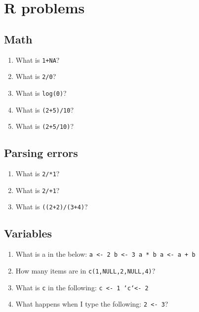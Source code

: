 \documentclass[12pt,a4paper]{article}
\begin{document}
\section*{R problems}

\onehalfspacing

\subsection*{Math}

\begin{enumerate}
\item What is \texttt{1+NA}?
\item What is \texttt{2/0}?
\item What is \texttt{log(0)}?
\vspace{1em}
\item What is \texttt{(2+5)/10}?
\item What is \texttt{(2+5/10)}?
\end{enumerate}


\subsection*{Parsing errors}
\begin{enumerate}
\item What is \texttt{2/*1}?
\item What is \texttt{2/+1}?
\vspace{1em}
\item What is \texttt{((2+2)/(3+4)}?
\end{enumerate}


\subsection*{Variables}
\begin{enumerate}
\item What is {a} in the below:
\texttt{a <- 2
b <- 3
a * b
a <- a + b
}
\item How many items are in \texttt{c(1,NULL,2,NULL,4)}?
\vspace{1em}
\item What is \texttt{c} in the following:
\texttt{c <- 1
\lq c\lq <- 2
}
\item What happens when I type the following: \texttt{2 <- 3}?
\end{enumerate}
\end{document}
